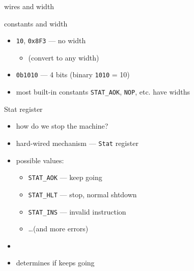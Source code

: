 \begin{frame}{wires and width}
\end{frame}

\begin{frame}{constants and width}
\begin{itemize}
\item {\tt 10}, {\tt 0x8F3} --- no width
\begin{itemize} \item (convert to any width) \end{itemize}
\item {\tt 0b1010} --- 4 bits (binary {\tt 1010} = 10)
    \vspace{.5cm}
\item most built-in constants {\tt STAT\_AOK}, {\tt NOP}, etc. have widths
\end{itemize}
\end{frame}


\begin{frame}{Stat register}
    \begin{itemize}
    \item how do we stop the machine?
    \item hard-wired mechanism --- {\tt Stat} register
    \item possible values:
        \begin{itemize}
        \item {\tt STAT\_AOK} --- keep going
        \item {\tt STAT\_HLT} --- stop, normal shtdown
        \item {\tt STAT\_INS} --- invalid instruction
        \item \ldots (and more errors)
        \end{itemize}
    \item {}
    \item determines if  keeps going
    \end{itemize}
\end{frame}

